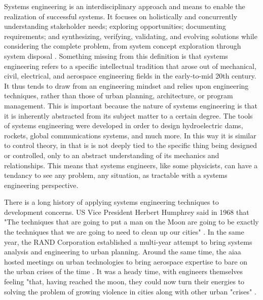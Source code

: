 \documentclass[notitlepage]{article}
\begin{document}
Systems engineering is an interdisciplinary approach and means to enable the realization of successful systems. It focuses on holistically and concurrently understanding stakeholder needs; exploring opportunities; documenting requirements; and synthesizing, verifying, validating, and evolving solutions while considering the complete problem, from system concept exploration through system disposal \cite{systemsengineeringbodyofknowledgeSystemsEngineeringGlossary2021}. Something missing from this definition is that systems engineering refers to a specific intellectual tradition that arose out of mechanical, civil, electrical, and aerospace engineering fields in the early-to-mid 20th century. It thus tends to draw from an engineering mindset and relies upon engineering techniques, rather than those of urban planning, architecture, or program management. This is important because the nature of systems engineering is that it is inherently abstracted from its subject matter to a certain degree. The tools of systems engineering were developed in order to design hydroelectric dams, rockets, global communications systems, and much more. In this way it is similar to control theory, in that is is not deeply tied to the specific thing being designed or controlled, only to an abstract understanding of its mechanics and relationships. This means that systems engineers, like some physicists, can have a tendancy to see any problem, any situation, as tractable with a systems engineering perspective.

There is a long history of applying systems engineering techniques to development concerns. US Vice President Herbert Humphrey said in 1968 that "The techniques that are going to put a man on the Moon are going to be exactly the techniques that we are going to need to clean up our cities" \cite{lightWarfareWelfareDefense2005}. In the same year, the RAND Corporation established a multi-year attempt to bring systems analysis and engineering to urban planning. Around the same time, the \ac{aiaa} hosted meetings on urban technologies to bring aerospace expertise to bare on the urban crises of the time \cite{lightWarfareWelfareDefense2005}. It was a heady time, with engineers themselves feeling "that, having reached the moon, they could now turn their energies to solving the problem of growing violence in cities along with other urban "crises" \cite{mazza2017}. 

%
\end{document}
